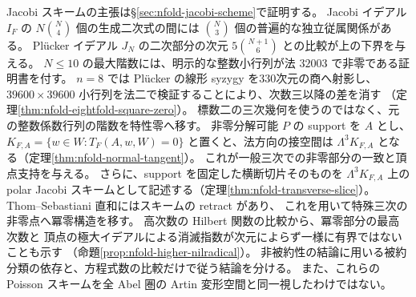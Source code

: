 Jacobi スキームの主張は\S\ref{sec:nfold-jacobi-scheme}で証明する。
Jacobi イデアル $I_F$ の $N\binom N4$ 個の生成二次式の間には
$\binom N3$ 個の普遍的な独立従属関係がある。
Pl\"ucker イデアル $J_N$ の二次部分の次元 $5\binom{N+1}{6}$ との比較が上の下界を与える。
$N\le10$ の最大階数には、明示的な整数小行列が法 $32003$ で非零である証明書を付す。
$n=8$ では Pl\"ucker の線形 syzygy を330次元の商へ射影し、
$39600\times39600$ 小行列を法二で検証することにより、次数三以降の差を消す
（定理\ref{thm:nfold-eightfold-square-zero}）。
標数二の三次幾何を使うのではなく、元の整数係数行列の階数を特性零へ移す。
非零分解可能 $P$ の support を $A$ とし、
$K_{F,A}=\{w\in W:T_F(A,w,W)=0\}$ と置くと、法方向の接空間は
$\Lambda^3K_{F,A}$ となる（定理\ref{thm:nfold-normal-tangent}）。
これが一般三次での非零部分の一致と頂点支持を与える。
さらに、support を固定した横断切片そのものを $\Lambda^3K_{F,A}$ 上の
polar Jacobi スキームとして記述する（定理\ref{thm:nfold-transverse-slice}）。
Thom--Sebastiani 直和にはスキームの retract があり、
これを用いて特殊三次の非零点へ冪零構造を移す。
高次数の Hilbert 関数の比較から、冪零部分の最高次数と
頂点の極大イデアルによる消滅指数が次元によらず一様に有界ではないことも示す
（命題\ref{prop:nfold-higher-nilradical}）。
非被約性の結論に用いる被約分類の依存と、方程式数の比較だけで従う結論を分ける。
また、これらの Poisson スキームを全 Abel 圏の Artin 変形空間と同一視したわけではない。

